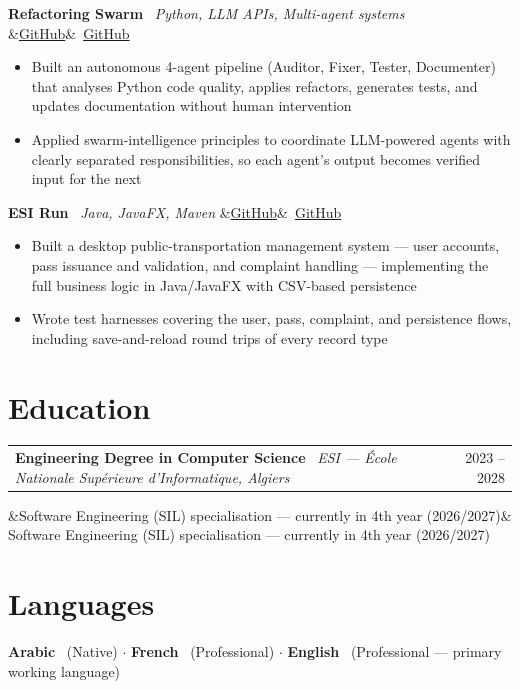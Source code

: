\documentclass[10pt, a4paper]{article}
\makeatletter
\newcommand{\cventry}[4]{%
  \noindent
  \begin{tabular*}{\linewidth}{@{}l@{\extracolsep{\fill}}r@{}}
    \textbf{#1} \textbullet\ \textit{#2} & \textcolor{textsecondary}{\small #3}
  \end{tabular*}%
  \ifx&#4&\else\\\textcolor{textsecondary}{\small #4}\fi%
  \vspace{1pt}%
}
\newcommand{\cvproject}[4]{%
  \noindent
  \textbf{#1}\ \textcolor{textsecondary}{\small #2}%
  \hfill\textcolor{textsecondary}{\small\textit{#3}}%
  \ifx&#4&\else\ \textcolor{accent}{\small #4}\fi\\[2pt]%
}
\makeatother
\begin{document}
\vspace{4pt}

\cvproject{Refactoring Swarm}{}{Python, LLM APIs, Multi-agent systems}{\href{https://github.com/Erraid7/Refactoring-Swarm-Equipe-24}{GitHub}}
\begin{itemize}
  \item Built an autonomous 4-agent pipeline (Auditor, Fixer, Tester, Documenter) that analyses Python code quality, applies refactors, generates tests, and updates documentation without human intervention
  \item Applied swarm-intelligence principles to coordinate LLM-powered agents with clearly separated responsibilities, so each agent's output becomes verified input for the next
\end{itemize}

\vspace{4pt}

\cvproject{ESI Run}{}{Java, JavaFX, Maven}{\href{https://github.com/Erraid7/javaFX_project}{GitHub}}
\begin{itemize}
  \item Built a desktop public-transportation management system --- user accounts, pass issuance and validation, and complaint handling --- implementing the full business logic in Java/JavaFX with CSV-based persistence
  \item Wrote test harnesses covering the user, pass, complaint, and persistence flows, including save-and-reload round trips of every record type
\end{itemize}

\section{Education}

\cventry{Engineering Degree in Computer Science}{ESI --- \'Ecole Nationale Sup\'erieure d'Informatique, Algiers}{2023 -- 2028}{Software Engineering (SIL) specialisation --- currently in 4th year (2026/2027)}

\section{Languages}

\noindent\small
\textbf{Arabic} \ (Native)
\quad$\cdot$\quad
\textbf{French} \ (Professional)
\quad$\cdot$\quad
\textbf{English} \ (Professional --- primary working language)
\end{document}
